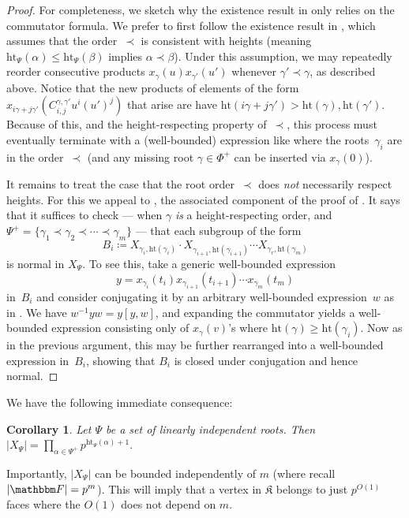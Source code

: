 \documentclass[10pt,a4paper]{article}
\newtheorem{corollary}[theorem]{Corollary}
\theoremstyle{definition}
\newcommand{\F}{\mathbbm F}
\newcommand{\hgt}{{\mathrm{ht}}}
\newcommand{\complex}{\mathfrak{K}}
\begin{document}
\begin{proof}
    For completeness, we sketch why the existence result in  only relies on the commutator formula.
    We prefer to first follow the existence result in \cite[Thm.~5.3.3]{Car89}, which assumes that the order~$\prec$ is consistent with heights (meaning $\hgt_{\Psi}(\alpha) \leq \hgt_{\Psi}(\beta)$ implies $\alpha \prec \beta$).  Under this assumption, we may repeatedly reorder consecutive products $x_{\gamma}(u)x_{\gamma'}(u')$ whenever $\gamma' \prec \gamma$, as described above.  Notice that the new products of elements of the form $x_{i\gamma + j \gamma'}(C_{i,j}^{\gamma,\gamma'} u^i (u')^j)$ that arise are have $\hgt(i\gamma + j \gamma') > \hgt(\gamma), \hgt(\gamma')$.  Because of this, and the height-respecting property of~$\prec$, this process must eventually terminate with a (well-bounded) expression like  where the roots~$\gamma_i$ are in the order~$\prec$ (and any missing root $\gamma \in \Phi^+$ can be inserted via $x_{\gamma}(0)$).  
    
    It remains to treat the case that the root order~$\prec$ does \emph{not} necessarily respect heights. For this we appeal to \cite[Lem.~18]{Ste16}, the associated component of the proof of .
    It says that it suffices to check --- when $\gamma$ \emph{is} a height-respecting order, and  $\Psi^+ = \{\gamma_1 \prec \gamma_2 \prec \cdots \prec \gamma_m\}$ --- that each subgroup of the form
    \[
        B_i \coloneqq X_{\gamma_i, \hgt(\gamma_i)} \cdot X_{\gamma_{i+1}, \hgt(\gamma_{i+1})} \cdots X_{\gamma_r, \hgt(\gamma_m)} 
    \]
    is normal in $X_\Psi$.  To see this, take a generic well-bounded expression
    \[
        y = x_{\gamma_i}(t_i) x_{\gamma_{i+1}}(t_{i+1})\cdots x_{\gamma_{m}}(t_m)
    \]
    in~$B_i$ and consider conjugating it by an arbitrary well-bounded expression~$w$ as in .  We have $w^{-1} y w = y [y,w]$, and expanding the commutator yields a well-bounded expression consisting only of $x_{\gamma}(v)$'s where $\hgt(\gamma) \geq \hgt(\gamma_i)$.  Now as in the previous argument, this may be further rearranged into a well-bounded expression in~$B_i$, showing that $B_i$ is closed under conjugation and hence normal.
\end{proof}

We have the following immediate consequence:
\begin{corollary}\label{subsize}
    Let $\Psi$ be a set of linearly independent roots. Then
$\displaystyle |X_{\Psi}| = \prod_{\alpha \in \Psi^+} p^{\hgt_{\Psi}(\alpha) + 1}.$
\end{corollary}
Importantly, $|X_{\Psi}|$ can be bounded independently of $m$ (where recall $|\F|=p^m$). This will imply that a vertex in $\complex$ belongs to just $p^{O(1)}$ faces where the $O(1)$ does  not depend on $m$.\\
\end{document}
